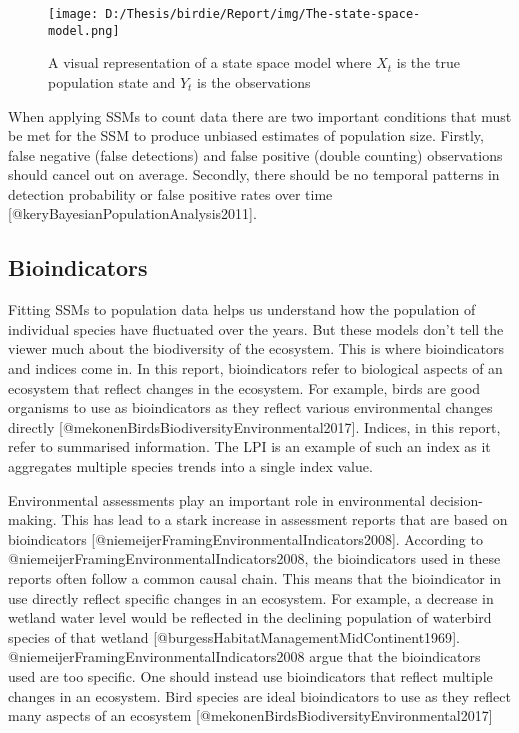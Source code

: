 \documentclass[
]{article}
\begin{document}
\begin{figure}[H]
  \texttt{[image: D:/Thesis/birdie/Report/img/The-state-space-model.png]}
  \caption{A visual representation of a state space model where $X_t$ is the true population state and $Y_t$ is the observations}
\end{figure}

When applying SSMs to count data there are two important conditions that
must be met for the SSM to produce unbiased estimates of population
size. Firstly, false negative (false detections) and false positive
(double counting) observations should cancel out on average. Secondly,
there should be no temporal patterns in detection probability or false
positive rates over time {[}@keryBayesianPopulationAnalysis2011{]}.

\hypertarget{bioindicators}{%
\subsection{Bioindicators}\label{bioindicators}}

Fitting SSMs to population data helps us understand how the population
of individual species have fluctuated over the years. But these models
don't tell the viewer much about the biodiversity of the ecosystem. This
is where bioindicators and indices come in. In this report,
bioindicators refer to biological aspects of an ecosystem that reflect
changes in the ecosystem. For example, birds are good organisms to use
as bioindicators as they reflect various environmental changes directly
{[}@mekonenBirdsBiodiversityEnvironmental2017{]}. Indices, in this
report, refer to summarised information. The LPI is an example of such
an index as it aggregates multiple species trends into a single index
value.

Environmental assessments play an important role in environmental
decision-making. This has lead to a stark increase in assessment reports
that are based on bioindicators
{[}@niemeijerFramingEnvironmentalIndicators2008{]}. According to
@niemeijerFramingEnvironmentalIndicators2008, the bioindicators used in
these reports often follow a common causal chain. This means that the
bioindicator in use directly reflect specific changes in an ecosystem.
For example, a decrease in wetland water level would be reflected in the
declining population of waterbird species of that wetland
{[}@burgessHabitatManagementMidContinent1969{]}.
@niemeijerFramingEnvironmentalIndicators2008 argue that the
bioindicators used are too specific. One should instead use
bioindicators that reflect multiple changes in an ecosystem. Bird
species are ideal bioindicators to use as they reflect many aspects of
an ecosystem {[}@mekonenBirdsBiodiversityEnvironmental2017{]}
\end{document}
